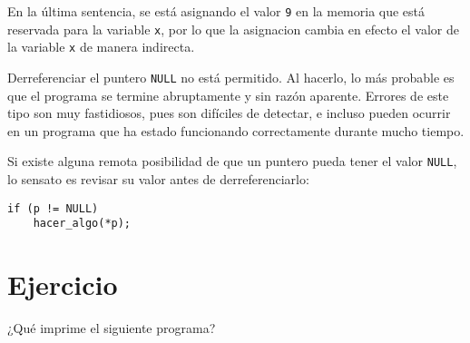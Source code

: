 En la última sentencia, se está asignando el valor \lstinline!9! en la
memoria que está reservada para la variable \lstinline!x!, por lo que la
asignacion cambia en efecto el valor de la variable \lstinline!x! de
manera indirecta.

Derreferenciar el puntero \lstinline!NULL! no está permitido. Al
hacerlo, lo más probable es que el programa se termine abruptamente y
sin razón aparente. Errores de este tipo son muy fastidiosos, pues son
difíciles de detectar, e incluso pueden ocurrir en un programa que ha
estado funcionando correctamente durante mucho tiempo.

Si existe alguna remota posibilidad de que un puntero pueda tener el
valor \lstinline!NULL!, lo sensato es revisar su valor antes de
derreferenciarlo:

\begin{lstlisting}
if (p != NULL)
    hacer_algo(*p);
\end{lstlisting}

\section{Ejercicio}

¿Qué imprime el siguiente programa?
